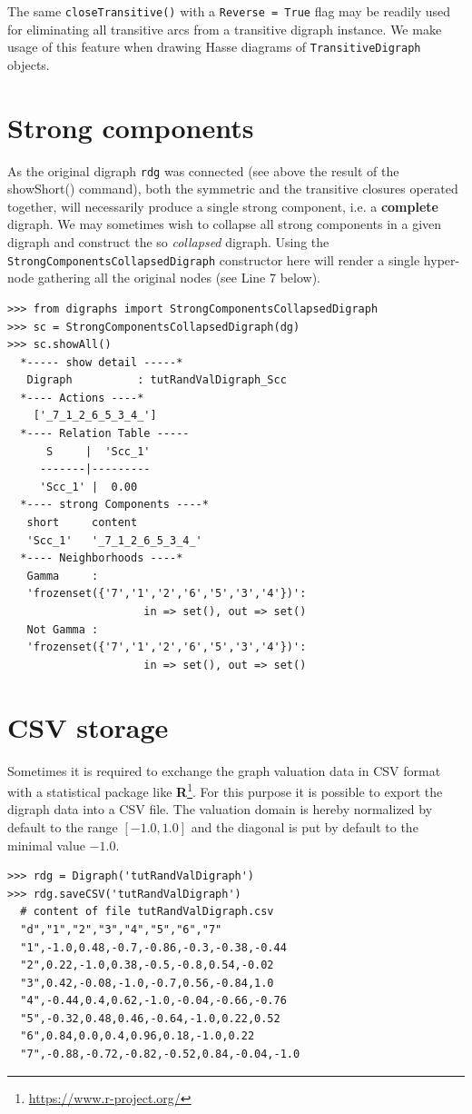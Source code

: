 The same \texttt{closeTransitive()} with a \texttt{Reverse = True} flag may be readily used for eliminating all transitive arcs from a transitive digraph instance. We make usage of this feature when drawing Hasse diagrams of \texttt{TransitiveDigraph} objects.

\section{Strong components}
\label{sec:2.8}

As the original digraph \texttt{rdg} was connected (see above the result of the showShort() command), both the symmetric and the transitive closures operated together, will necessarily produce a single strong component, i.e. a \textbf{complete} digraph. We may sometimes wish to collapse all strong components in a given digraph and construct the so \emph{collapsed} digraph. Using the \texttt{StrongComponentsCollapsedDigraph} constructor  here will render a single hyper-node gathering all the original nodes (see Line 7 below).
\begin{lstlisting}[caption={Computing the strong components in a digraph},label=list:2.10]
>>> from digraphs import StrongComponentsCollapsedDigraph
>>> sc = StrongComponentsCollapsedDigraph(dg)
>>> sc.showAll()
  *----- show detail -----*
   Digraph          : tutRandValDigraph_Scc
  *---- Actions ----*
    ['_7_1_2_6_5_3_4_']
  *---- Relation Table -----
      S     |  'Scc_1'	  
     -------|---------
     'Scc_1' |  0.00
  *---- strong Components ----*
   short 	 content
   'Scc_1' 	 '_7_1_2_6_5_3_4_'
  *---- Neighborhoods ----*
   Gamma     :
   'frozenset({'7','1','2','6','5','3','4'})':
                     in => set(), out => set()
   Not Gamma :
   'frozenset({'7','1','2','6','5','3','4'})':
                     in => set(), out => set()
\end{lstlisting}
  
\section{CSV storage}
\label{sec:2.9}

Sometimes it is required to exchange the graph valuation data in CSV format with a statistical package like \textbf{R}\footnote{\url{https://www.r-project.org/}}. For this purpose it is possible to export the digraph data into a CSV file. The valuation domain is hereby normalized by default to the range $[-1.0,1.0]$ and the diagonal is put by default to the minimal value $-1.0$.
\begin{lstlisting}
>>> rdg = Digraph('tutRandValDigraph')
>>> rdg.saveCSV('tutRandValDigraph')
  # content of file tutRandValDigraph.csv
  "d","1","2","3","4","5","6","7"
  "1",-1.0,0.48,-0.7,-0.86,-0.3,-0.38,-0.44
  "2",0.22,-1.0,0.38,-0.5,-0.8,0.54,-0.02
  "3",0.42,-0.08,-1.0,-0.7,0.56,-0.84,1.0
  "4",-0.44,0.4,0.62,-1.0,-0.04,-0.66,-0.76
  "5",-0.32,0.48,0.46,-0.64,-1.0,0.22,0.52
  "6",0.84,0.0,0.4,0.96,0.18,-1.0,0.22
  "7",-0.88,-0.72,-0.82,-0.52,0.84,-0.04,-1.0
\end{lstlisting}
  

